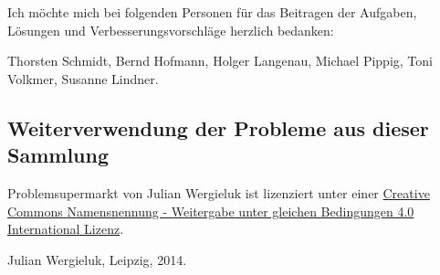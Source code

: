 Ich möchte mich bei folgenden Personen für das Beitragen der Aufgaben, Lösungen und
Verbesserungsvorschläge herzlich bedanken: 

Thorsten Schmidt, Bernd Hofmann, Holger Langenau, Michael Pippig, Toni Volkmer,
Susanne Lindner.

\subsection*{Weiterverwendung der Probleme aus dieser Sammlung}

Problemsupermarkt von Julian Wergieluk ist lizenziert unter einer
\href{http://creativecommons.org/licenses/by-sa/4.0/}{Creative Commons
Namensnennung - Weitergabe unter gleichen Bedingungen 4.0 International
Lizenz}.

\begin{flushright}
Julian Wergieluk, Leipzig, 2014.
\end{flushright}


